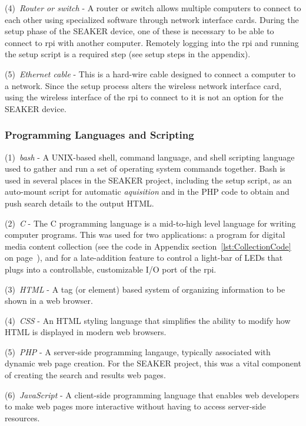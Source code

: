 \documentclass[12pt]{article}
\begin{document}
(4)~{\em Router or switch} - A router or switch allows multiple computers
to connect to each other using specialized software through network
interface cards.  During the setup phase of the SEAKER device,
one of these is necessary to be able to connect to \gls{rpi} with
another computer.  Remotely logging into the \gls{rpi} and running the
setup script is a required step (see setup steps in the appendix).

(5)~{\em Ethernet cable} - This is a hard-wire cable designed to connect
a computer to a network.  Since the setup process alters the wireless
network interface card, using the wireless interface of the \gls{rpi} to
connect to it is not an option for the SEAKER device.


\subsubsection{Programming Languages and Scripting}

(1)~{\em bash} - A UNIX-based shell, command language, and shell
scripting language used to gather and run a set of operating system
commands together.  Bash is used in several places in the SEAKER
project, including the setup script, as an auto-mount script
for automatic {\em aquisition} and in the PHP code to obtain and
push search details to the output HTML.

(2)~{\em C} - The C programming language is a mid-to-high level
language for writing computer programs.  This was used for two
applications: a program for digital media content collection 
(see the code in Appendix section~\ref{lst:CollectionCode}
on page~\pageref{lst:CollectionCode}),
and for a late-addition feature to control a light-bar of LEDs that
plugs into a controllable, customizable I/O port of the \gls{rpi}.

(3)~{\em HTML} - A tag (or element) based system of organizing
information to be shown in a web browser.

(4)~{\em CSS} - An HTML styling language that simplifies the
ability to modify how HTML is displayed in modern web browsers.

(5)~{\em PHP} - A server-side programming langauge, typically
associated with dynamic web page creation.  For the SEAKER
project, this was a vital component of creating the search and
results web pages.

(6)~{\em JavaScript} - A client-side programming language that 
enables web developers to make web pages more interactive without
having to access server-side resources.
\end{document}
